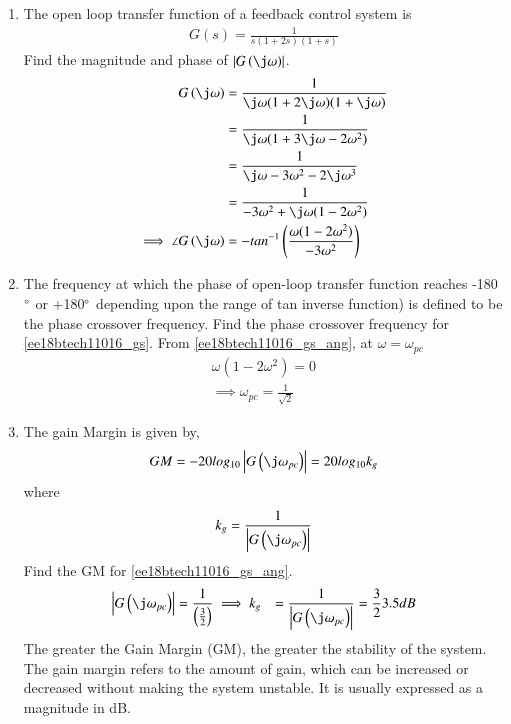 \begin{enumerate}[label=\thesubsection.\arabic*.,ref=\thesubsection.\theenumi]
\item The open loop transfer function of a feedback control system is  
\begin{align}
G(s) = \frac{1}{s(1+2s)(1+s)} 
\label{ee18btech11016_gs}
\end{align}
%
Find the magnitude and phase of $\abs{G\brak{\j\omega}}$.
\\
\solution
\begin{align}
G\brak{\j\omega} &= \frac{1}{\j\omega(1+2\j\omega)(1+\j\omega)} 
\\
 &= \frac{1}{\j\omega(1+3\j\omega-2\omega^2)}
\\
&=\frac{1}{\j\omega-3\omega^2-2\j\omega^3}
\\
 &= \frac{1}{-3\omega^2+\j\omega(1-2\omega^2)} 
\\
\implies \angle G\brak{\j\omega}&=- tan^{-1}\brak{\frac{\omega(1-2\omega^2)}{-3\omega^2}}
\label{ee18btech11016_gs_ang}
\end{align}
%
\item The frequency at which the phase of open-loop transfer function reaches -180$\degree$ or +180$\degree$ depending upon the range of tan inverse function) is defined to be the phase crossover frequency.  Find the phase crossover frequency for  \eqref{ee18btech11016_gs}.
\solution From \eqref{ee18btech11016_gs_ang}, at $\omega=\omega_{pc}$ 
\begin{align}
\omega(1-2\omega^2) = 0 
\\
\implies \omega_{pc} = \frac{1}{\sqrt{2}} 
\end{align}
\item The gain Margin is given by,
\begin{align}
GM = -20log_{10}\abs{G\brak{\j\omega_{pc}}} = 20log_{10}k_{g}
\end{align}
where 
\begin{align}
k_{g}=\frac{1}{\abs{G\brak{\j\omega_{pc}}}} 
\end{align}
%
Find the GM for \eqref{ee18btech11016_gs_ang}.
\\
\solution 
\begin{align}
\abs{G\brak{\j\omega_{pc}}} &= \frac{1}{\brak{\frac{3}{2}}}
\implies k_{g}&=\frac{1}{\abs{G\brak{\j\omega_{pc}}}} = \frac{3}{2}
3.5dB
\end{align}
The greater the Gain Margin (GM), the greater the stability of the system. The gain margin refers to the amount of gain, which can be increased or decreased without making the system unstable. It is usually expressed as a magnitude in dB.

\end{enumerate}
